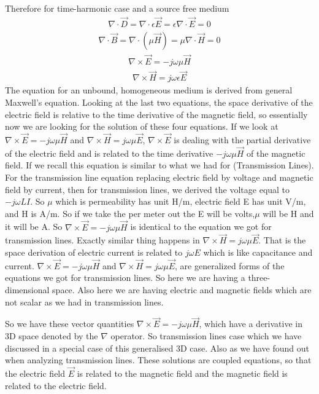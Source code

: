 Therefore for time-harmonic case and a source free medium
\begin{align}
\nabla\cdot\vec{D}=\nabla\cdot \epsilon \vec{E}=\epsilon \nabla\cdot\vec{E}=0
\end{align}
\begin{align}
\nabla\cdot\vec{B}=\nabla\cdot (\mu\vec{H})=\mu \nabla\cdot\vec{H}=0
\end{align}
\begin{align}
\nabla \times \vec{E}=-j\omega\mu\vec{H}
\end{align}
\begin{align}
\nabla\times\vec{H}=j\omega\epsilon\vec{E}
\end{align}
The equation for an unbound, homogeneous medium is derived from general Maxwell's equation. Looking at the last two equations, the space derivative of the electric field is relative to the time derivative of the magnetic field, so essentially now we are looking for the solution of these four equations. If we look at $\nabla\times\vec{E}=-j\omega\mu\vec{H}$ and $\nabla\times\vec{H}=j\omega\mu\vec{E}$, $\nabla\times\vec{E}$ is dealing with the partial derivative of the electric field and is related to the time derivative $-j\omega\mu\vec{H}$ of the magnetic field. If we recall this equation is similar to what we had for (Transmission Lines). For the transmission line equation replacing electric field by voltage and magnetic field by current, then for transmission lines, we derived the voltage equal to $-j\omega LI$. So $\mu$ which is permeability has unit H/m, electric field E has unit V/m, and H is A/m. So if we take the per meter out the E will be volts,$\mu$ will be H and it will be A. So $\nabla\times\vec{E}=-j\omega\mu\vec{H}$ is identical to the equation we got for transmission lines. Exactly similar thing happens in $\nabla\times\vec{H}=j\omega\mu\vec{E}$. That is the space derivation of electric current is related to $j\omega E$ which is like capacitance and current. $\nabla\times\vec{E}=-j\omega\mu\vec{H}$ and $\nabla\times\vec{H}=j\omega\mu\vec{E}$, are generalized forms of the equations we got for transmission lines. So here we are having a three-dimensional space. Also here we are having electric and magnetic fields which are not scalar as we had in transmission lines.

So we have these vector quantities $\nabla\times\vec{E}=-j\omega\mu\vec{H}$, which have a derivative in 3D space denoted by the $\nabla$ operator. So transmission lines case which we have discussed in a special case of this generalised 3D case. Also as we have found out when analyzing transmission lines. These solutions are coupled equations, so that the electric field $\vec{E}$ is related to the magnetic field and the magnetic field is related to the electric field.


